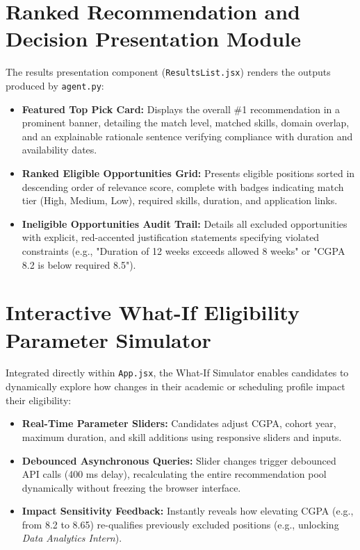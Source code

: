 \section{Ranked Recommendation and Decision Presentation Module} \label{S5.5}
The results presentation component (\texttt{ResultsList.jsx}) renders the outputs produced by \texttt{agent.py}:
\begin{itemize}
	\item \textbf{Featured Top Pick Card:} Displays the overall \#1 recommendation in a prominent banner, detailing the match level, matched skills, domain overlap, and an explainable rationale sentence verifying compliance with duration and availability dates.
	\item \textbf{Ranked Eligible Opportunities Grid:} Presents eligible positions sorted in descending order of relevance score, complete with badges indicating match tier (High, Medium, Low), required skills, duration, and application links.
	\item \textbf{Ineligible Opportunities Audit Trail:} Details all excluded opportunities with explicit, red-accented justification statements specifying violated constraints (e.g., "Duration of 12 weeks exceeds allowed 8 weeks" or "CGPA 8.2 is below required 8.5").
\end{itemize}

\section{Interactive What-If Eligibility Parameter Simulator} \label{S5.6}
Integrated directly within \texttt{App.jsx}, the What-If Simulator enables candidates to dynamically explore how changes in their academic or scheduling profile impact their eligibility:
\begin{itemize}
	\item \textbf{Real-Time Parameter Sliders:} Candidates adjust CGPA, cohort year, maximum duration, and skill additions using responsive sliders and inputs.
	\item \textbf{Debounced Asynchronous Queries:} Slider changes trigger debounced API calls (400 ms delay), recalculating the entire recommendation pool dynamically without freezing the browser interface.
	\item \textbf{Impact Sensitivity Feedback:} Instantly reveals how elevating CGPA (e.g., from 8.2 to 8.65) re-qualifies previously excluded positions (e.g., unlocking \textit{Data Analytics Intern}).
\end{itemize}

